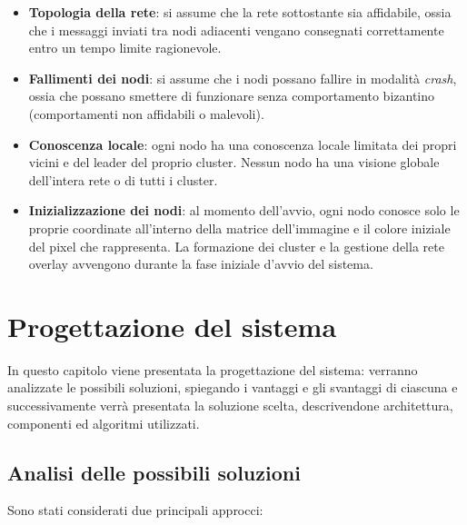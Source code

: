 \documentclass[12pt, a4paper]{report}
\begin{document}
\begin{itemize}
    \item \textbf{Topologia della rete}: si assume che la rete sottostante sia affidabile, ossia che i messaggi inviati tra nodi adiacenti vengano consegnati correttamente entro un tempo limite ragionevole.


    \item \textbf{Fallimenti dei nodi}: si assume che i nodi possano fallire in modalit\`a \emph{crash}, ossia che possano smettere di funzionare senza comportamento bizantino (comportamenti non affidabili o malevoli).

    \item \textbf{Conoscenza locale}: ogni nodo ha una conoscenza locale limitata dei propri vicini e del leader del proprio cluster. Nessun nodo ha una visione globale dell'intera rete o di tutti i cluster.

    \item \textbf{Inizializzazione dei nodi}: al momento dell'avvio, ogni nodo conosce solo le proprie coordinate all'interno della matrice dell'immagine e il colore iniziale del pixel che rappresenta. La formazione dei cluster e la gestione della rete overlay avvengono durante la fase iniziale d'avvio del sistema.

\end{itemize}

\chapter{Progettazione del sistema}

In questo capitolo viene presentata la progettazione del sistema: verranno analizzate le possibili soluzioni, spiegando i vantaggi e gli svantaggi di ciascuna e successivamente verr\`a presentata la soluzione scelta, descrivendone architettura, componenti ed algoritmi utilizzati.

\section{Analisi delle possibili soluzioni}

Sono stati considerati due principali approcci:
\end{document}
